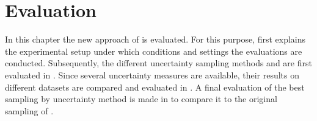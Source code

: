\chapter{Evaluation}
\label{ch:evaluation}
In this chapter the new approach of \usgan is evaluated.
For this purpose,  first explains the experimental setup under which conditions and settings the evaluations are conducted.
Subsequently, the different uncertainty sampling methods \usmax and \ussoftmax are first evaluated in .
Since several uncertainty measures are available, their results on different datasets are compared and evaluated in .
A final evaluation of the best sampling by uncertainty method is made in  to compare it to the original sampling of \kbgan.








